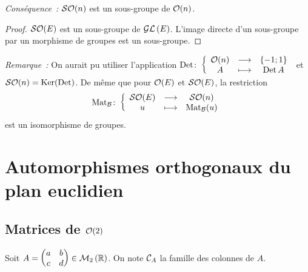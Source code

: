 \emph{Conséquence~:} \(\SOrth{n}\) est un sous-groupe de \(\Orth{n}\).
\begin{proof}
  \(\SOrth{E}\) est un sous-groupe de \(\GL{E}\). L'image directe d'un 
  sous-groupe par un morphisme de groupes est un sous-groupe.
\end{proof}

\emph{Remarque~:} On aurait pu utiliser l'application 
\(\fonction{\Det}{\Orth{n}}{\{-1;1\}}{A}{\Det A}\) et 
\(\SOrth{n}=\Ker(\Det)\). De même que pour \(\Orth{E}\) et \(\SOrth{E}\), la 
restriction
\begin{equation}
\fonction{\Mat_\B}{\SOrth{E}}{\SOrth{n}}{u}{\Mat_\B(u)} \end{equation}
est un isomorphisme de groupes. 

\section{Automorphismes orthogonaux du plan euclidien}

\subsection{Matrices de \(\Orth{2}\)}

Soit \(A = 
\begin{pmatrix} 
  a & b \\
  c & d
\end{pmatrix} \in \Mn{2}{\R}
\). On note \(\courbe_A\) la famille des colonnes de \(A\).

